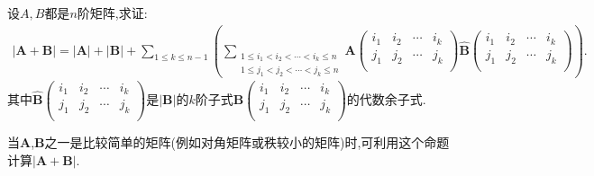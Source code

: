 \documentclass[../../main.tex]{subfiles}%
\begin{document}
\begin{proposition}[矩阵和的行列式计算公式]\label{proposition:矩阵和的行列式计算公式}
设\(A,B\)都是\(n\)阶矩阵,求证:
\begin{align*}
|\boldsymbol{A}+\boldsymbol{B}|=|\boldsymbol{A}|+|\boldsymbol{B}|+\sum_{1\leqslant k\leqslant n-1}{\left( \sum_{\substack{1\leqslant i_1<i_2<\cdots <i_k\leqslant n\\1\leqslant j_1<j_2<\cdots <j_k\leqslant n}}{\boldsymbol{A}\left( \begin{matrix}
i_1&		i_2&		\cdots&		i_k\\
j_1&		j_2&		\cdots&		j_k\\
\end{matrix} \right) \widehat{\boldsymbol{B}}\left( \begin{matrix}
i_1&		i_2&		\cdots&		i_k\\
j_1&		j_2&		\cdots&		j_k\\
\end{matrix} \right)} \right)}.
\end{align*}
其中$\widehat{\boldsymbol{B}}\left( \begin{matrix}
i_1&		i_2&		\cdots&		i_k\\
j_1&		j_2&		\cdots&		j_k\\
\end{matrix} \right)$是$|\boldsymbol{B}|$的$k$阶子式$\boldsymbol{B}\left( \begin{matrix}
i_1&		i_2&		\cdots&		i_k\\
j_1&		j_2&		\cdots&		j_k\\
\end{matrix} \right)$的代数余子式.
\end{proposition}
\begin{note}
当\(\boldsymbol{A}\),\(\boldsymbol{B}\)之一是比较简单的矩阵(例如对角矩阵或秩较小的矩阵)时,可利用这个命题计算$|\boldsymbol{A}+\boldsymbol{B}|$.
\end{note}
\end{document}
